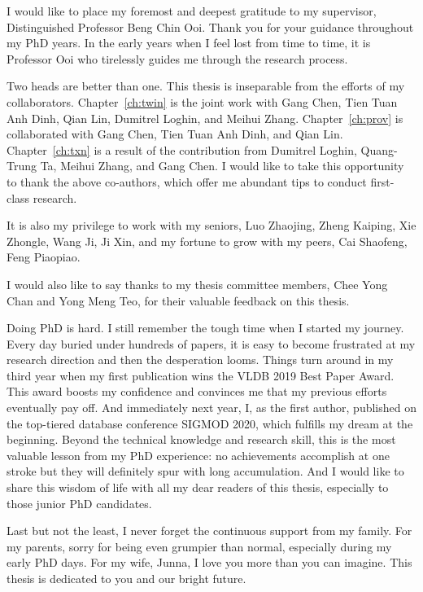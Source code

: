 \begin{acknowledgments}

I would like to place my foremost and deepest gratitude to my supervisor, Distinguished Professor Beng Chin Ooi. 
Thank you for your guidance throughout my PhD years. 
In the early years when I feel lost from time to time, it is Professor Ooi who tirelessly guides me through the research process. 

Two heads are better than one. This thesis is inseparable from the efforts of my collaborators. 
Chapter~\ref{ch:twin} is the joint work with Gang Chen, Tien Tuan Anh Dinh, Qian Lin, Dumitrel Loghin, and Meihui Zhang. 
Chapter~\ref{ch:prov} is collaborated with Gang Chen, Tien Tuan Anh Dinh, and Qian Lin. 
Chapter~\ref{ch:txn} is a result of the contribution from Dumitrel Loghin, Quang-Trung Ta, Meihui Zhang, and Gang Chen.
I would like to take this opportunity to thank the above co-authors, which offer me abundant tips to conduct first-class research. 

It is also my privilege to work with my seniors, Luo Zhaojing, Zheng Kaiping, Xie Zhongle, Wang Ji, Ji Xin, and my fortune to grow with my peers, Cai Shaofeng, Feng Piaopiao. 

I would also like to say thanks to my thesis committee members, Chee Yong Chan and Yong Meng Teo, for their valuable feedback on this thesis. 

Doing PhD is hard. I still remember the tough time when I started my journey. Every day buried under hundreds of papers, it is easy to become frustrated at my research direction and then the desperation looms. 
Things turn around in my third year when my first publication wins the VLDB 2019 Best Paper Award. This award boosts my confidence and convinces me that my previous efforts eventually pay off. 
And immediately next year, I, as the first author, published on the top-tiered database conference SIGMOD 2020, which fulfills my dream at the beginning. 
Beyond the technical knowledge and research skill, this is the most valuable lesson from my PhD experience: no achievements accomplish at one stroke but they will definitely spur with long accumulation.  
And I would like to share this wisdom of life with all my dear readers of this thesis, especially to those junior PhD candidates. 

Last but not the least, I never forget the continuous support from my family. For my parents, sorry for being even grumpier than normal, especially during my early PhD days. For my wife, Junna, I love you more than you can imagine. This thesis is dedicated to you and our bright future. 
    

\end{acknowledgments}
